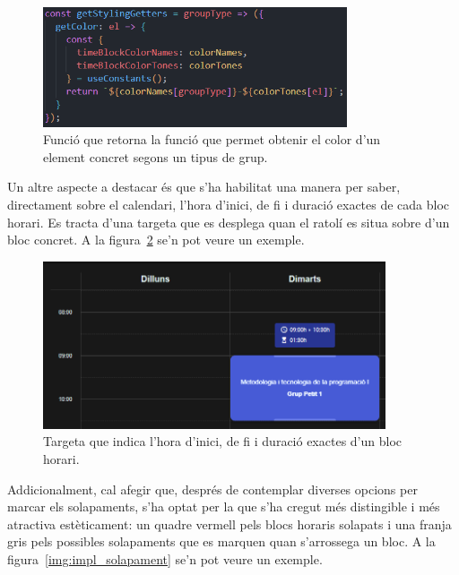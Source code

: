 \documentclass[a4paper,12pt]{ThesisStyle}
\begin{document}
\begin{figure}[H]
  \centering
  \includegraphics[width=0.8\textwidth]{assets/code/usabilitat/getColor.png}
  \caption{\label{img:getColor} Funció que retorna la funció que permet obtenir el color d'un element concret segons un tipus de grup.}
\end{figure}

Un altre aspecte a destacar és que s'ha habilitat una manera per saber, directament sobre el calendari, l'hora d'inici, de fi i duració exactes de cada bloc horari. Es tracta d'una targeta que es desplega quan el ratolí es situa sobre d'un bloc concret. A la figura~\ref{img:hourTooltip} se'n pot veure un exemple.

\newpage

\begin{figure}[H]
  \centering
  \includegraphics[width=0.9\textwidth]{assets/code/usabilitat/hourTooltip.png}
  \caption{\label{img:hourTooltip} Targeta que indica l'hora d'inici, de fi i duració exactes d'un bloc horari.}
\end{figure}

Addicionalment, cal afegir que, després de contemplar diverses opcions per marcar els solapaments, s'ha optat per la que s'ha cregut més distingible i més atractiva estèticament: un quadre vermell pels blocs horaris solapats i una franja gris pels possibles solapaments que es marquen quan s'arrossega un bloc. A la figura~\ref{img:impl_solapament} se'n pot veure un exemple.
\end{document}
